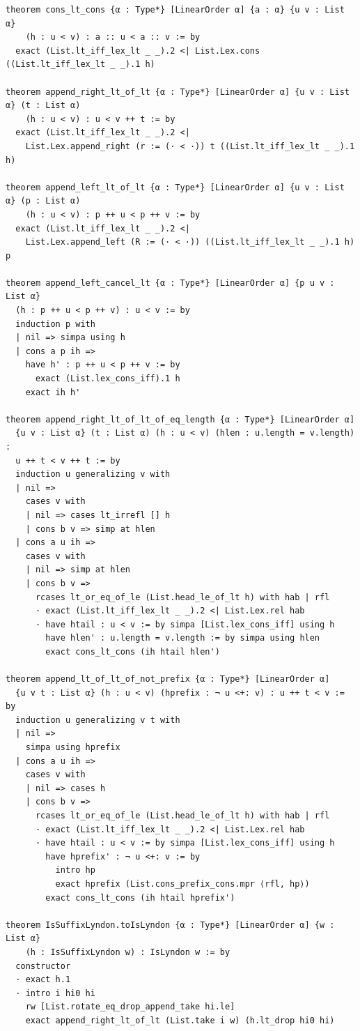 \documentclass[11pt]{article}
\theoremstyle{definition}
\theoremstyle{remark}
\begin{document}
\begin{lstlisting}
theorem cons_lt_cons {α : Type*} [LinearOrder α] {a : α} {u v : List α}
    (h : u < v) : a :: u < a :: v := by
  exact (List.lt_iff_lex_lt _ _).2 <| List.Lex.cons ((List.lt_iff_lex_lt _ _).1 h)

theorem append_right_lt_of_lt {α : Type*} [LinearOrder α] {u v : List α} (t : List α)
    (h : u < v) : u < v ++ t := by
  exact (List.lt_iff_lex_lt _ _).2 <|
    List.Lex.append_right (r := (· < ·)) t ((List.lt_iff_lex_lt _ _).1 h)

theorem append_left_lt_of_lt {α : Type*} [LinearOrder α] {u v : List α} (p : List α)
    (h : u < v) : p ++ u < p ++ v := by
  exact (List.lt_iff_lex_lt _ _).2 <|
    List.Lex.append_left (R := (· < ·)) ((List.lt_iff_lex_lt _ _).1 h) p

theorem append_left_cancel_lt {α : Type*} [LinearOrder α] {p u v : List α}
  (h : p ++ u < p ++ v) : u < v := by
  induction p with
  | nil => simpa using h
  | cons a p ih =>
    have h' : p ++ u < p ++ v := by
      exact (List.lex_cons_iff).1 h
    exact ih h'

theorem append_right_lt_of_lt_of_eq_length {α : Type*} [LinearOrder α]
  {u v : List α} (t : List α) (h : u < v) (hlen : u.length = v.length) :
  u ++ t < v ++ t := by
  induction u generalizing v with
  | nil =>
    cases v with
    | nil => cases lt_irrefl [] h
    | cons b v => simp at hlen
  | cons a u ih =>
    cases v with
    | nil => simp at hlen
    | cons b v =>
      rcases lt_or_eq_of_le (List.head_le_of_lt h) with hab | rfl
      · exact (List.lt_iff_lex_lt _ _).2 <| List.Lex.rel hab
      · have htail : u < v := by simpa [List.lex_cons_iff] using h
        have hlen' : u.length = v.length := by simpa using hlen
        exact cons_lt_cons (ih htail hlen')

theorem append_lt_of_lt_of_not_prefix {α : Type*} [LinearOrder α]
  {u v t : List α} (h : u < v) (hprefix : ¬ u <+: v) : u ++ t < v := by
  induction u generalizing v t with
  | nil =>
    simpa using hprefix
  | cons a u ih =>
    cases v with
    | nil => cases h
    | cons b v =>
      rcases lt_or_eq_of_le (List.head_le_of_lt h) with hab | rfl
      · exact (List.lt_iff_lex_lt _ _).2 <| List.Lex.rel hab
      · have htail : u < v := by simpa [List.lex_cons_iff] using h
        have hprefix' : ¬ u <+: v := by
          intro hp
          exact hprefix (List.cons_prefix_cons.mpr ⟨rfl, hp⟩)
        exact cons_lt_cons (ih htail hprefix')

theorem IsSuffixLyndon.toIsLyndon {α : Type*} [LinearOrder α] {w : List α}
    (h : IsSuffixLyndon w) : IsLyndon w := by
  constructor
  · exact h.1
  · intro i hi0 hi
    rw [List.rotate_eq_drop_append_take hi.le]
    exact append_right_lt_of_lt (List.take i w) (h.lt_drop hi0 hi)


\end{lstlisting}
\end{document}
